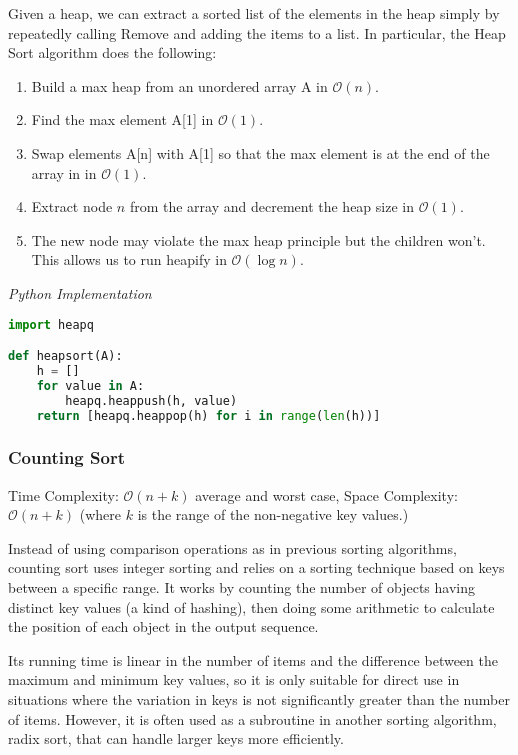 \documentclass{article}
\newcommand{\bigO}{\ensuremath{\mathcal{O}}}
\begin{document}
    Given a heap, we can extract a sorted list of the elements in the heap simply by repeatedly calling Remove and adding the items to a list. In particular, the Heap Sort algorithm does the following: 
    \begin{enumerate}
        \item Build a max heap from an unordered array A in $\bigO(n)$.
        \item Find the max element A[1] in $\bigO(1)$.
        \item Swap elements A[n] with A[1] so that the max element is at the end of the array in in $\bigO(1)$.
        \item Extract node $n$ from the array and decrement the heap size in $\bigO(1)$.
        \item The new node may violate the max heap principle but the children won't. This allows us to run heapify in $\bigO(\log n)$.
    \end{enumerate}
    
\vspace{8pt} \emph{Python Implementation}
\begin{lstlisting}[language=Python]
import heapq

def heapsort(A):
    h = []
    for value in A:
        heapq.heappush(h, value)
    return [heapq.heappop(h) for i in range(len(h))]
\end{lstlisting}

    \subsubsection{Counting Sort}
    Time Complexity: $\bigO(n + k)$ average and worst case, Space Complexity: $\bigO(n + k)$ (where $k$ is the range of the non-negative key values.)
    
    Instead of using comparison operations as in previous sorting algorithms, counting sort uses integer sorting and relies on a sorting technique based on keys between a specific range. It works by counting the number of objects having distinct key values (a kind of hashing), then doing some arithmetic to calculate the position of each object in the output sequence.
    
    Its running time is linear in the number of items and the difference between the maximum and minimum key values, so it is only suitable for direct use in situations where the variation in keys is not significantly greater than the number of items. However, it is often used as a subroutine in another sorting algorithm, radix sort, that can handle larger keys more efficiently.
\end{document}
